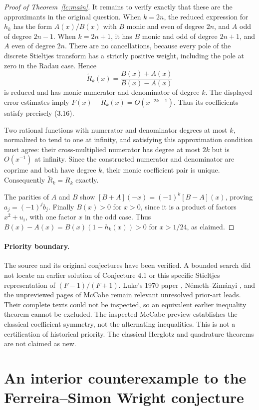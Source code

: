\documentclass[11pt,a4paper]{article}
\theoremstyle{definition}
\theoremstyle{remark}
\numberwithin{equation}{section}
\begin{document}
\begin{proof}[Proof of Theorem~\ref{lc:main}]
It remains to verify exactly that these are the approximants in
the original question. When $k=2n$, the reduced expression for
$h_k$ has the form $A(x)/B(x)$ with $B$ monic and even of degree
$2n$, and $A$ odd of degree $2n-1$. When $k=2n+1$, it has $B$
monic and odd of degree $2n+1$, and $A$ even of degree $2n$.
There are no cancellations, because every pole of the discrete
Stieltjes transform has a strictly positive weight, including the
pole at zero in the Radau case. Hence
\[
 \widetilde R_k(x)=\frac{B(x)+A(x)}{B(x)-A(x)}
\]
is reduced and has monic numerator and denominator of degree $k$.
The displayed error estimates imply
$F(x)-\widetilde R_k(x)=O(x^{-2k-1})$.
Thus its coefficients satisfy precisely (3.16).

Two rational functions with numerator and denominator degrees at
most $k$, normalized to tend to one at infinity, and satisfying
this approximation condition must agree: their cross-multiplied
numerator has degree at most $2k$ but is $O(x^{-1})$ at infinity.
Since the constructed numerator and denominator are coprime and
both have degree $k$, their monic coefficient pair is unique.
Consequently $\widetilde R_k=R_k$ exactly.

The parities of $A$ and $B$ show
$[B+A](-x)=(-1)^k[B-A](x)$, proving
$a_j=(-1)^jb_j$. Finally $B(x)>0$ for $x>0$, since it is a product
of factors $x^2+u_i$, with one factor $x$ in the odd case.
Thus $B(x)-A(x)=B(x)(1-h_k(x))>0$ for $x>1/24$, as claimed.
\end{proof}

\paragraph{Priority boundary.}
The source and its original conjectures have been verified. A
bounded search did not locate an earlier solution of Conjecture 4.1
or this specific Stieltjes representation of $(F-1)/(F+1)$.
Luke's 1970 paper \cite{Luke1970}, N\'emeth--Zim\'anyi
\cite{NemethZimanyi1982}, and the unpreviewed pages of McCabe
\cite{McCabe1989} remain relevant unresolved prior-art leads.
Their complete texts could not be inspected, so an equivalent earlier
inequality theorem cannot be excluded. The inspected McCabe preview
establishes the classical coefficient symmetry, not the alternating
inequalities. This is not a certification of historical priority. The classical
Herglotz and quadrature theorems are not claimed as new.

\section{An interior counterexample to the Ferreira--Simon Wright conjecture}
\label{sec:wright-counterexample}
\end{document}
